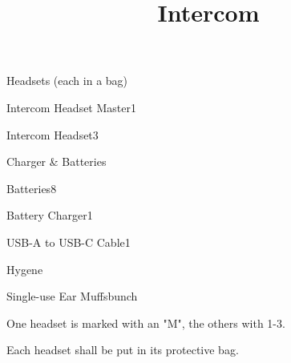 \def\papersize{5}




\title{Intercom}

\begin{checklist}{Headsets (each in a bag)}
  \item{Intercom Headset Master}{1}
  \item{Intercom Headset}{3}
\end{checklist}

\begin{checklist}{Charger \& Batteries}
  \item{Batteries}{8}
  \item{Battery Charger}{1}
  \item{USB-A to USB-C Cable}{1}
\end{checklist}

\begin{checklist}{Hygene}
  \item{Single-use Ear Muffs}{bunch}
\end{checklist}

One headset is marked with an "M", the others with 1-3.

Each headset shall be put in its protective bag.


